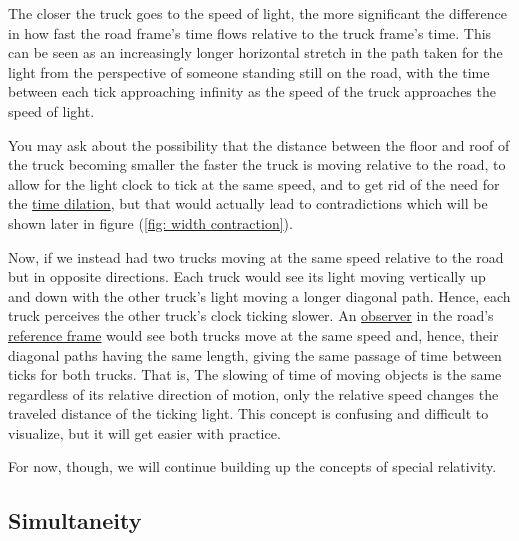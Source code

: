 The closer the truck goes to the speed of light, the more significant the difference in how fast the road frame's time flows relative to the truck frame's time.
This can be seen as an increasingly longer horizontal stretch in the path taken for the light from the perspective of someone standing still on the road, with the time between each tick approaching infinity as the speed of the truck approaches the speed of light.

You may ask about the possibility that the distance between the floor and roof of the truck becoming smaller the faster the truck is moving relative to the road, to allow for the light clock to tick at the same speed, and to get rid of the need for the \hyperlink{def-time-dilation}{time dilation}, but that would actually lead to contradictions which will be shown later in figure (\ref{fig: width contraction}).

Now, if we instead had two trucks moving at the same speed relative to the road but in opposite directions.
Each truck would see its light moving vertically up and down with the other truck's light moving a longer diagonal path.
Hence, each truck perceives the other truck's clock ticking slower.
An \hyperlink{def-observer}{observer} in the road's \hyperlink{def-Reference-frame}{reference frame} would see both trucks move at the same speed and, hence, their diagonal paths having the same length, giving the same passage of time between ticks for both trucks.
That is, The slowing of time of moving objects is the same regardless of its relative direction of motion, only the relative speed changes the traveled distance of the ticking light.
This concept is confusing and difficult to visualize, but it will get easier with practice.


For now, though, we will continue building up the concepts of special relativity.


\subsection{Simultaneity} \label{subsect: Simultaneity}

